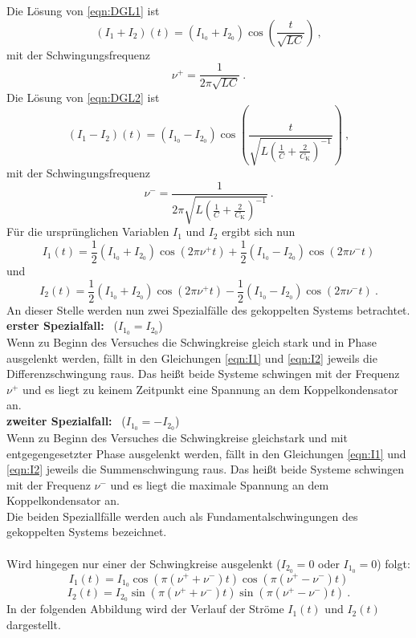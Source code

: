 Die Lösung von \ref{eqn:DGL1} ist
\begin{equation}
	(I_1 + I_2)(t) = (I_{1_0} + I_{2_0}) \cos \left(\frac{t}{\sqrt{LC}} \right) \ ,
\end{equation}
mit der Schwingungsfrequenz
\begin{equation}
	\nu^+ = \frac{1}{2 \pi \sqrt{LC}} \ .
\end{equation}
Die Lösung von \ref{eqn:DGL2} ist
\begin{equation}
	(I_1 - I_2)(t) = (I_{1_0} - I_{2_0}) \cos \left(\frac{t}{\sqrt{L \left(\frac{1}{C} + \frac{2}{C_\text{K}} \right)^{-1}}} \right) \ ,
\end{equation}
mit der Schwingungsfrequenz
\begin{equation}
\nu^- = \frac{1}{2 \pi \sqrt{L \left(\frac{1}{C} + \frac{2}{C_\text{K}} \right)^{-1}}} \ .
\end{equation}
Für die ursprünglichen Variablen $I_1$ und $I_2$ ergibt sich nun
\begin{equation}
	I_1(t) = \frac{1}{2}(I_{1_0} + I_{2_0}) \cos(2 \pi \nu^+ t) + \frac{1}{2}(I_{1_0} - I_{2_0}) \cos(2 \pi \nu^- t)
	\label{eqn:I1}
\end{equation}
und
\begin{equation}
	I_2(t) = \frac{1}{2}(I_{1_0} + I_{2_0}) \cos(2 \pi \nu^+ t) - \frac{1}{2}(I_{1_0} - I_{2_0}) \cos(2 \pi \nu^- t) \ .
	\label{eqn:I2}
\end{equation}
An dieser Stelle werden nun zwei Spezialfälle des gekoppelten Systems betrachtet. \\
\textbf{erster Spezialfall:} \ ($I_{1_0} = I_{2_0}$) \\
Wenn zu Beginn des Versuches die Schwingkreise gleich stark und in Phase ausgelenkt werden, fällt in den Gleichungen \ref{eqn:I1} und \ref{eqn:I2} jeweils die Differenzschwingung raus. Das heißt beide Systeme schwingen mit der Frequenz $\nu^+$ und es liegt zu keinem Zeitpunkt eine Spannung an dem Koppelkondensator an. \\
\textbf{zweiter Spezialfall:} \ ($I_{1_0} = -I_{2_0}$) \\
Wenn zu Beginn des Versuches die Schwingkreise gleichstark und mit entgegengesetzter Phase ausgelenkt werden, fällt in den Gleichungen \ref{eqn:I1} und \ref{eqn:I2} jeweils die Summenschwingung raus. Das heißt beide Systeme schwingen mit der Frequenz $\nu^-$ und es liegt die maximale Spannung an dem Koppelkondensator an. \\
Die beiden Speziallfälle werden auch als Fundamentalschwingungen des gekoppelten Systems bezeichnet.\\
\\
Wird hingegen nur einer der Schwingkreise ausgelenkt ($I_{2_0} = 0$ oder $I_{1_0} = 0$) folgt:
\begin{equation}
	I_1(t) = I_{1_0} \cos(\pi (\nu^+ + \nu^-)t) \cos(\pi (\nu^+ - \nu^-)t)
\end{equation}
\begin{equation}
	I_2(t) = I_{2_0} \sin(\pi (\nu^+ + \nu^-)t) \sin(\pi (\nu^+ - \nu^-)t) \ .
\end{equation}
In der folgenden Abbildung wird der Verlauf der Ströme $I_1(t)$ und $I_2(t)$ dargestellt.

